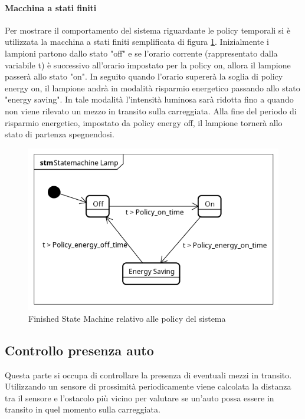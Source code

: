 \paragraph{Macchina a stati finiti}
Per mostrare il comportamento del sistema riguardante le policy temporali si è utilizzata la macchina a stati finiti semplificata di figura \ref{FSM POLICY}.
Inizialmente i lampioni partono dallo stato "off" e se l'orario corrente (rappresentato dalla variabile t) è successivo all'orario impostato per la policy on, allora il lampione passerà allo stato "on".
In seguito quando l'orario supererà la soglia di policy energy on, il lampione andrà in modalità risparmio energetico passando allo stato "energy saving".
In tale modalità l'intensità luminosa sarà ridotta fino a quando non viene rilevato un mezzo in transito sulla carreggiata.
Alla fine del periodo di risparmio energetico, impostato da policy energy off, il lampione tornerà allo stato di partenza spegnendosi.
\begin{figure}[ht]
	\centering
	\includegraphics[scale=.8]{figure/Statemachine_Lamp.png}
	\caption{Finished State Machine relativo alle policy del sistema \label{FSM POLICY}}
\end{figure}

\newpage
\subsection{Controllo presenza auto}
Questa parte si occupa di controllare la presenza di eventuali mezzi in transito.
Utilizzando un sensore di prossimità periodicamente viene calcolata la distanza tra il sensore e l'ostacolo più vicino per valutare se un'auto possa essere in transito in quel momento sulla carreggiata.
